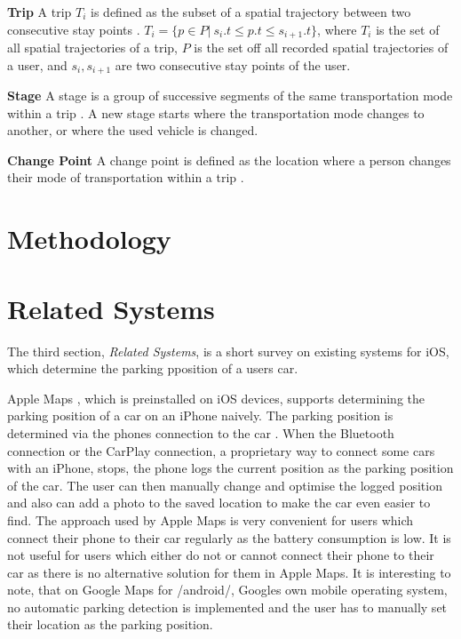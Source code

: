 \textbf{Trip} A trip $T_i$ is defined as the subset of a spatial trajectory between two consecutive stay points \cite{Zheng2008}. $T_i = \{p \in P |\: s_i.t \leq p.t \leq s_{i+1}.t \}$, where $T_i$ is the set of all spatial trajectories of a trip, $P$ is the set off all recorded spatial trajectories of a user, and $s_i, s_{i+1}$ are two consecutive stay points of the user. 

\textbf{Stage} A stage is a group of successive segments of the same transportation mode within a trip \cite{Bolbol2012}. A new stage starts where the transportation mode changes to another, or where the used vehicle is changed.

\textbf{Change Point} A change point is defined as the location where a person changes their mode of transportation within a trip \cite{Zheng2008}.

\section{Methodology}



\section{Related Systems}
The third section, \textit{Related Systems}, is a short survey on existing systems for iOS, which determine the parking pposition of a users car.


Apple Maps \cite{apple:maps}, which is preinstalled on iOS devices, supports determining the parking position of a car on an iPhone naively.  The parking position is determined via the phones connection to the car \cite{apple:maps:parkedcar}. When the Bluetooth connection or the CarPlay connection, a proprietary way to connect some cars with an iPhone, stops, the phone logs the current position as the parking position of the car. The user can then manually change and optimise the logged position and also can add a photo to the saved location to make the car even easier to find.
The approach used by Apple Maps is very convenient for users which connect their phone to their car regularly as the battery consumption is low. It is not useful for users which either do not or cannot connect their phone to their car as there is no alternative solution for them in Apple Maps. It is interesting to note, that on Google Maps for /android/, Googles own mobile operating system, no automatic parking detection is implemented and the user has to manually set their location as the parking position.

